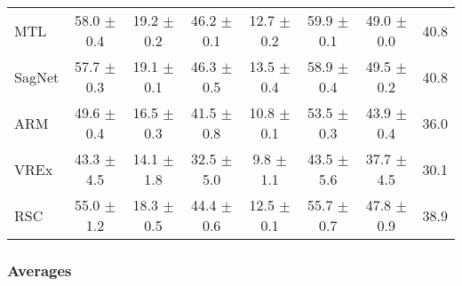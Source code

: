 \documentclass{article}
\begin{document}
\begin{center}
{\begin{tabular}{lccccccc}
MTL                  & 58.0 $\pm$ 0.4       & 19.2 $\pm$ 0.2       & 46.2 $\pm$ 0.1       & 12.7 $\pm$ 0.2       & 59.9 $\pm$ 0.1       & 49.0 $\pm$ 0.0       & 40.8                 \\
SagNet               & 57.7 $\pm$ 0.3       & 19.1 $\pm$ 0.1       & 46.3 $\pm$ 0.5       & 13.5 $\pm$ 0.4       & 58.9 $\pm$ 0.4       & 49.5 $\pm$ 0.2       & 40.8                 \\
ARM                  & 49.6 $\pm$ 0.4       & 16.5 $\pm$ 0.3       & 41.5 $\pm$ 0.8       & 10.8 $\pm$ 0.1       & 53.5 $\pm$ 0.3       & 43.9 $\pm$ 0.4       & 36.0                 \\
VREx                 & 43.3 $\pm$ 4.5       & 14.1 $\pm$ 1.8       & 32.5 $\pm$ 5.0       & 9.8 $\pm$ 1.1        & 43.5 $\pm$ 5.6       & 37.7 $\pm$ 4.5       & 30.1                 \\
RSC                  & 55.0 $\pm$ 1.2       & 18.3 $\pm$ 0.5       & 44.4 $\pm$ 0.6       & 12.5 $\pm$ 0.1       & 55.7 $\pm$ 0.7       & 47.8 $\pm$ 0.9       & 38.9                 \\
\bottomrule
\end{tabular}}
\end{center}

\subsubsection{Averages}
\end{document}

